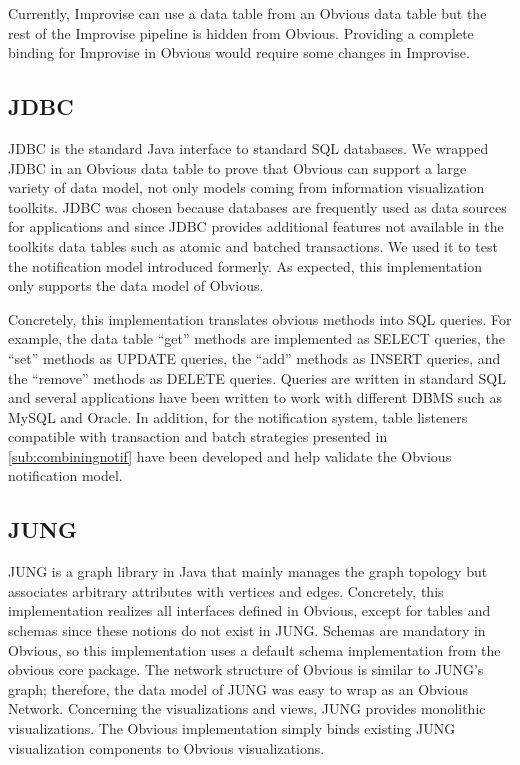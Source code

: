 Currently, Improvise can use a data table from an Obvious data table
but the rest of the Improvise pipeline is hidden from
Obvious. Providing a complete binding for Improvise in Obvious would
require some changes in Improvise.

\subsection{JDBC}

JDBC is the standard Java interface to standard SQL databases.  We
wrapped JDBC in an Obvious data table to prove that Obvious can
support a large variety of data model, not only models coming from
information visualization toolkits.  JDBC was chosen because databases
are frequently used as data sources for applications and since JDBC
provides additional features not available in the toolkits data tables
such as atomic and batched transactions.  We used it to test the
notification model introduced formerly.  As expected, this
implementation only supports the data model of Obvious.

Concretely, this implementation translates obvious methods into SQL
queries.  For example, the data table ``get'' methods are implemented
as SELECT queries, the ``set'' methods as UPDATE queries, the ``add''
methods as INSERT queries, and the ``remove'' methods as DELETE
queries.  Queries are written in standard SQL and several applications
have been written to work with different DBMS such as MySQL and
Oracle.  In addition, for the notification system, table listeners
compatible with transaction and batch strategies presented in
\ref{sub:combiningnotif} have been developed and help validate the
Obvious notification model.

\subsection{JUNG}

JUNG is a graph library in Java that mainly manages the graph topology
but associates arbitrary attributes with vertices and edges.
Concretely, this implementation realizes all interfaces defined in
Obvious, except for tables and schemas since these notions do not
exist in JUNG.  Schemas are mandatory in Obvious, so this
implementation uses a default schema implementation from the obvious
core package.  The network structure of Obvious is similar to JUNG's
graph; therefore, the data model of JUNG was easy to wrap as an
Obvious Network.  Concerning the visualizations and views, JUNG
provides monolithic visualizations.  The Obvious implementation simply
binds existing JUNG visualization components to Obvious visualizations.

